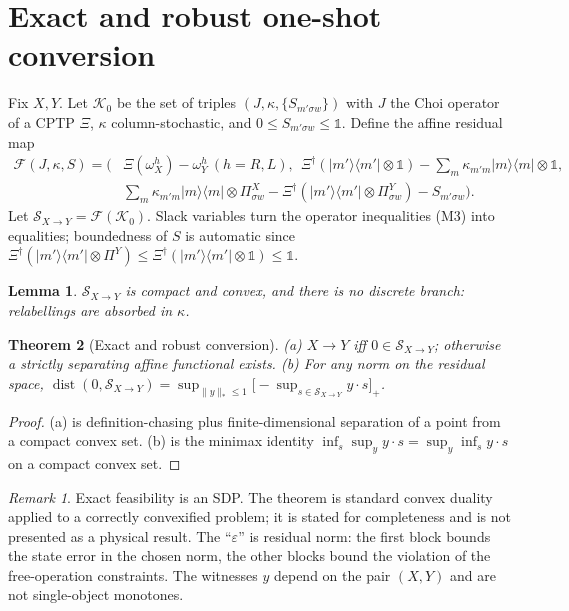 \documentclass[11pt]{article}
\newtheorem{theorem}{Theorem}
\newtheorem{lemma}[theorem]{Lemma}
\theoremstyle{definition}
\theoremstyle{remark}
\newtheorem{remark}{Remark}
\newcommand{\one}{\mathbb{1}}
\DeclareMathOperator{\dist}{dist}
\begin{document}
\section{Exact and robust one-shot conversion}
\label{sec:conv}

Fix $X,Y$. Let $\mathcal K_0$ be the set of triples $(J,\kappa,\{S_{m'\sigma w}\})$ with $J$ the Choi operator of a CPTP $\Xi$, $\kappa$ column-stochastic, and $0\le S_{m'\sigma w}\le\one$. Define the affine residual map
\begin{align*}
\mathcal F(J,\kappa,S)=\bigl(&\Xi(\omega^h_X)-\omega^h_Y\ (h=R,L),\ \ \Xi^\dagger(|m'\rangle\!\langle m'|\otimes\one)-\textstyle\sum_m\kappa_{m'm}|m\rangle\!\langle m|\otimes\one,\\
&\textstyle\sum_m\kappa_{m'm}|m\rangle\!\langle m|\otimes\Pi^X_{\sigma w}-\Xi^\dagger(|m'\rangle\!\langle m'|\otimes\Pi^Y_{\sigma w})-S_{m'\sigma w}\bigr).
\end{align*}
Let $\mathcal S_{X\to Y}=\mathcal F(\mathcal K_0)$. Slack variables turn the operator inequalities (M3) into equalities; boundedness of $S$ is automatic since $\Xi^\dagger(|m'\rangle\!\langle m'|\otimes\Pi^Y)\le\Xi^\dagger(|m'\rangle\!\langle m'|\otimes\one)\le\one$.

\begin{lemma}\label{lem:S}
$\mathcal S_{X\to Y}$ is compact and convex, and there is no discrete branch: relabellings are absorbed in $\kappa$.
\end{lemma}
\begin{theorem}[Exact and robust conversion]\label{thm:conv}
(a) $X\to Y$ iff $0\in\mathcal S_{X\to Y}$; otherwise a strictly separating affine functional exists.
(b) For any norm on the residual space, $\dist(0,\mathcal S_{X\to Y})=\sup_{\|y\|_*\le1}\bigl[-\sup_{s\in\mathcal S_{X\to Y}}y\cdot s\bigr]_+$.
\end{theorem}
\begin{proof}
(a) is definition-chasing plus finite-dimensional separation of a point from a compact convex set. (b) is the minimax identity $\inf_s\sup_yy\cdot s=\sup_y\inf_sy\cdot s$ on a compact convex set.
\end{proof}
\begin{remark}
Exact feasibility is an SDP. The theorem is standard convex duality applied to a correctly convexified problem; it is stated for completeness and is not presented as a physical result. The ``$\varepsilon$'' is residual norm: the first block bounds the state error in the chosen norm, the other blocks bound the violation of the free-operation constraints. The witnesses $y$ depend on the pair $(X,Y)$ and are not single-object monotones.
\end{remark}
\end{document}
